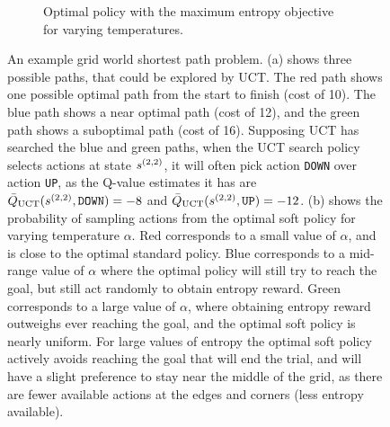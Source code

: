 \begin{figure}
\begin{subfigure}[b]{0.49\textwidth}
            \caption{Optimal policy with the maximum entropy objective for varying temperatures.}
            \label{fig:4:shortest_path_intro_b}
        \end{subfigure}
        \caption[An example grid world shortest path problem.]{An example grid world shortest path problem. (a) shows three possible paths, that could be explored by UCT. The red path shows one possible optimal path from the start to finish (cost of 10). The blue path shows a near optimal path (cost of 12), and the green path shows a suboptimal path (cost of 16). Supposing UCT has searched the blue and green paths, when the UCT search policy selects actions at state $s^{(2,2)}$, it will often pick action \texttt{DOWN} over action \texttt{UP}, as the Q-value estimates it has are ${\bar{Q}_{{\textnormal{UCT}}}}(s^{(2,2)},\texttt{DOWN})=-8$ and ${\bar{Q}_{{\textnormal{UCT}}}}(s^{(2,2)},\texttt{UP})=-12$. (b) shows the probability of sampling actions from the optimal soft policy for varying temperature $\alpha$. Red corresponds to a small value of $\alpha$, and is close to the optimal standard policy. Blue corresponds to a mid-range value of $\alpha$ where the optimal policy will still try to reach the goal, but still act randomly to obtain entropy reward. Green corresponds to a large value of $\alpha$, where obtaining entropy reward outweighs ever reaching the goal, and the optimal soft policy is nearly uniform. For large values of entropy the optimal soft policy actively avoids reaching the goal that will end the trial, and will have a slight preference to stay near the middle of the grid, as there are fewer available actions at the edges and corners (less entropy available). }
        \label{fig:4:shortest_path_intro}
    \end{figure}
    

